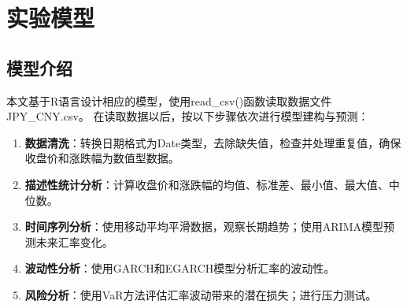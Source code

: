 
\chapter{实验模型}
\section{模型介绍}
本文基于R语言设计相应的模型，使用read\_csv()函数读取数据文件JPY\_CNY.csv。
在读取数据以后，按以下步骤依次进行模型建构与预测：
\begin{enumerate}
    \item \textbf{数据清洗}：转换日期格式为Date类型，去除缺失值，检查并处理重复值，确保收盘价和涨跌幅为数值型数据。
    \item \textbf{描述性统计分析}：计算收盘价和涨跌幅的均值、标准差、最小值、最大值、中位数。
    \item \textbf{时间序列分析}：使用移动平均平滑数据，观察长期趋势；使用ARIMA模型预测未来汇率变化。
    \item \textbf{波动性分析}：使用GARCH和EGARCH模型分析汇率的波动性。
    \item \textbf{风险分析}：使用VaR方法评估汇率波动带来的潜在损失；进行压力测试。
\end{enumerate}

